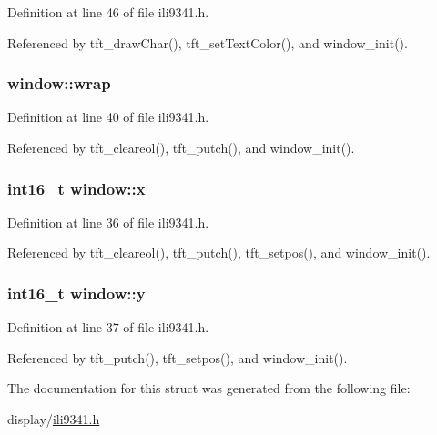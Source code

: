 Definition at line 46 of file ili9341.\-h.



Referenced by tft\-\_\-draw\-Char(), tft\-\_\-set\-Text\-Color(), and window\-\_\-init().

\hypertarget{structwindow_aee853dc29d3cf708890faff063ce9afb}{
\subsubsection[{wrap}]{ window\-::wrap}}\label{structwindow_aee853dc29d3cf708890faff063ce9afb}


Definition at line 40 of file ili9341.\-h.



Referenced by tft\-\_\-cleareol(), tft\-\_\-putch(), and window\-\_\-init().

\hypertarget{structwindow_a879b99940dfc34772f0257f54c67b817}{
\subsubsection[{x}]{\setlength{\rightskip}{0pt plus 5cm}int16\-\_\-t window\-::x}}\label{structwindow_a879b99940dfc34772f0257f54c67b817}


Definition at line 36 of file ili9341.\-h.



Referenced by tft\-\_\-cleareol(), tft\-\_\-putch(), tft\-\_\-setpos(), and window\-\_\-init().

\hypertarget{structwindow_a95c7023fc42e79ab42c291b90a490776}{
\subsubsection[{y}]{\setlength{\rightskip}{0pt plus 5cm}int16\-\_\-t window\-::y}}\label{structwindow_a95c7023fc42e79ab42c291b90a490776}


Definition at line 37 of file ili9341.\-h.



Referenced by tft\-\_\-putch(), tft\-\_\-setpos(), and window\-\_\-init().



The documentation for this struct was generated from the following file\-:\begin{DoxyCompactItemize}
\item 
display/\hyperlink{ili9341_8h}{ili9341.\-h}\end{DoxyCompactItemize}
